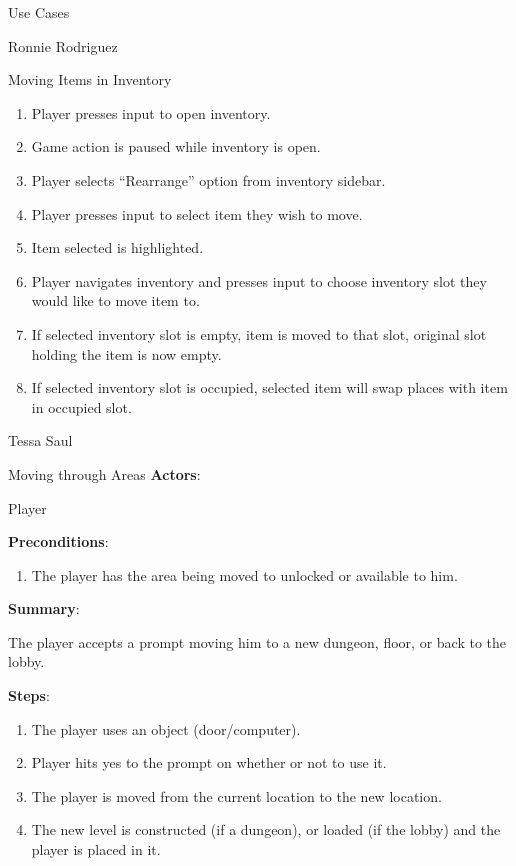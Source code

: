 \documentclass[12pt]{report}
\begin{document}
\begin{section}{Use Cases}
\begin{subsection}{Ronnie Rodriguez}
\begin{subsubsection}{Moving Items in Inventory}
\begin{enumerate}
\item Player presses input to open inventory.
\item Game action is paused while inventory is open.
\item Player selects ``Rearrange'' option from inventory sidebar.
\item Player presses input to select item they wish to move.
\item Item selected is highlighted.
\item Player navigates inventory and presses input to choose inventory slot
they would like to move item to.
\item If selected inventory slot is empty, item is moved to that slot,
original slot holding the item is now empty.
\item If selected inventory slot is occupied, selected item will swap places
with item in occupied slot. 
\end{enumerate}
\end{subsubsection}
\end{subsection}

\begin{subsection}{Tessa Saul}
\begin{subsubsection}{Moving through Areas}
\textbf{Actors}:

Player

\textbf{Preconditions}:

\begin{enumerate}
\item The player has the area being moved to unlocked or available to him.
\end{enumerate}

\textbf{Summary}:

The player accepts a prompt moving him to a new dungeon, floor, or
back to the lobby.

\textbf{Steps}:

\begin{enumerate}
\item The player uses an object (door/computer).
\item Player hits yes to the prompt on whether or not to use it.
\item The player is moved from the current location to the new location.
\item The new level is constructed (if a dungeon), or loaded (if the lobby)
and the player is placed in it.
\end{enumerate}
\end{subsubsection}


\end{subsection}
\end{section}
\end{document}
